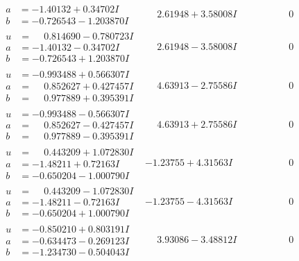 \documentclass[1p]{elsarticle_modified}
\theoremstyle{definition}
\begin{document}
$$\begin{array}{c|c|c}
\begin{aligned}
a &= -1.40132 + 0.34702 I \\
b &= -0.726543 - 1.203870 I\end{aligned}
 & \phantom{-}2.61948 + 3.58008 I & \phantom{-0.000000 } 0 \\ \hline\begin{aligned}
u &= \phantom{-}0.814690 - 0.780723 I \\
a &= -1.40132 - 0.34702 I \\
b &= -0.726543 + 1.203870 I\end{aligned}
 & \phantom{-}2.61948 - 3.58008 I & \phantom{-0.000000 } 0 \\ \hline\begin{aligned}
u &= -0.993488 + 0.566307 I \\
a &= \phantom{-}0.852627 + 0.427457 I \\
b &= \phantom{-}0.977889 + 0.395391 I\end{aligned}
 & \phantom{-}4.63913 - 2.75586 I & \phantom{-0.000000 } 0 \\ \hline\begin{aligned}
u &= -0.993488 - 0.566307 I \\
a &= \phantom{-}0.852627 - 0.427457 I \\
b &= \phantom{-}0.977889 - 0.395391 I\end{aligned}
 & \phantom{-}4.63913 + 2.75586 I & \phantom{-0.000000 } 0 \\ \hline\begin{aligned}
u &= \phantom{-}0.443209 + 1.072830 I \\
a &= -1.48211 + 0.72163 I \\
b &= -0.650204 - 1.000790 I\end{aligned}
 & -1.23755 + 4.31563 I & \phantom{-0.000000 } 0 \\ \hline\begin{aligned}
u &= \phantom{-}0.443209 - 1.072830 I \\
a &= -1.48211 - 0.72163 I \\
b &= -0.650204 + 1.000790 I\end{aligned}
 & -1.23755 - 4.31563 I & \phantom{-0.000000 } 0 \\ \hline\begin{aligned}
u &= -0.850210 + 0.803191 I \\
a &= -0.634473 - 0.269123 I \\
b &= -1.234730 - 0.504043 I\end{aligned}
 & \phantom{-}3.93086 - 3.48812 I & \phantom{-0.000000 } 0 \\ \hline\begin{aligned}

\end{aligned}
\end{array}$$
\end{document}
